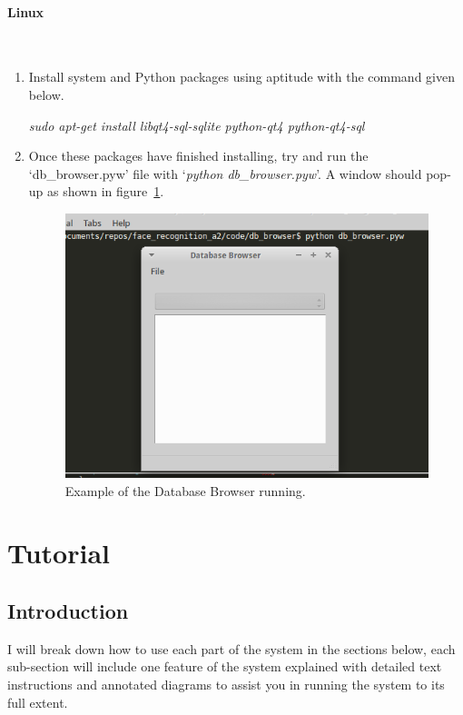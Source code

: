 \documentclass[a4paper]{article}
\begin{document}
        \paragraph{Linux}\mbox{}\\
        \begin{enumerate}
            \item Install system and Python packages using aptitude with the command given below.

            \textit{sudo apt-get install libqt4-sql-sqlite python-qt4 python-qt4-sql}

            \item Once these packages have finished installing, try and run the `db\_browser.pyw' file with `\textit{python db\_browser.pyw}'.
            A window should pop-up as shown in figure~\ref{fig:dbbrowserrun}.

            \begin{figure}[H]
                \centering
                \caption{Example of the Database Browser running.}
                \label{fig:dbbrowserrun}
                    \includegraphics[scale=0.6]{../shared_assets/screenshots/manual/dbbrowserrun.png}
            \end{figure}
        \end{enumerate}

\section{Tutorial}

    \subsection{Introduction}
        I will break down how to use each part of the system in the sections below, each sub-section will include one feature of
        the system explained with detailed text instructions and annotated diagrams to assist you in running the system to its full extent.
\end{document}
